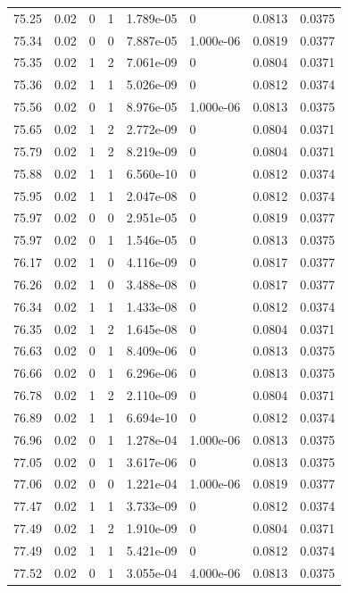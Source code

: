 \documentclass[preview]{standalone}
\begin{document}
{{{{{{{{{{{\begin{tabular}{L{1.2cm}C{1.2cm} C{0.3cm}C{0.5cm} C{1.4cm}C{1.4cm} C{1.4cm}C{1.4cm}}
  75.25  &  0.02  & 0     &  1 &  1.789e-05  & 0  & 0.0813 &  0.0375   \\ 
  75.34  &  0.02  & 0     &  0 &  7.887e-05  & 1.000e-06  & 0.0819 &  0.0377   \\ 
  75.35  &  0.02  & 1     &  2 &  7.061e-09  & 0  & 0.0804 &  0.0371   \\ 
  75.36  &  0.02  & 1     &  1 &  5.026e-09  & 0  & 0.0812 &  0.0374   \\ 
  75.56  &  0.02  & 0     &  1 &  8.976e-05  & 1.000e-06  & 0.0813 &  0.0375   \\ 
  75.65  &  0.02  & 1     &  2 &  2.772e-09  & 0  & 0.0804 &  0.0371   \\ 
  75.79  &  0.02  & 1     &  2 &  8.219e-09  & 0  & 0.0804 &  0.0371   \\ 
  75.88  &  0.02  & 1     &  1 &  6.560e-10  & 0  & 0.0812 &  0.0374   \\ 
  75.95  &  0.02  & 1     &  1 &  2.047e-08  & 0  & 0.0812 &  0.0374   \\ 
  75.97  &  0.02  & 0     &  0 &  2.951e-05  & 0  & 0.0819 &  0.0377   \\ 
  75.97  &  0.02  & 0     &  1 &  1.546e-05  & 0  & 0.0813 &  0.0375   \\ 
  76.17  &  0.02  & 1     &  0 &  4.116e-09  & 0  & 0.0817 &  0.0377   \\ 
  76.26  &  0.02  & 1     &  0 &  3.488e-08  & 0  & 0.0817 &  0.0377   \\ 
  76.34  &  0.02  & 1     &  1 &  1.433e-08  & 0  & 0.0812 &  0.0374   \\ 
  76.35  &  0.02  & 1     &  2 &  1.645e-08  & 0  & 0.0804 &  0.0371   \\ 
  76.63  &  0.02  & 0     &  1 &  8.409e-06  & 0  & 0.0813 &  0.0375   \\ 
  76.66  &  0.02  & 0     &  1 &  6.296e-06  & 0  & 0.0813 &  0.0375   \\ 
  76.78  &  0.02  & 1     &  2 &  2.110e-09  & 0  & 0.0804 &  0.0371   \\ 
  76.89  &  0.02  & 1     &  1 &  6.694e-10  & 0  & 0.0812 &  0.0374   \\ 
  76.96  &  0.02  & 0     &  1 &  1.278e-04  & 1.000e-06  & 0.0813 &  0.0375   \\ 
  77.05  &  0.02  & 0     &  1 &  3.617e-06  & 0  & 0.0813 &  0.0375   \\ 
  77.06  &  0.02  & 0     &  0 &  1.221e-04  & 1.000e-06  & 0.0819 &  0.0377   \\ 
  77.47  &  0.02  & 1     &  1 &  3.733e-09  & 0  & 0.0812 &  0.0374   \\ 
  77.49  &  0.02  & 1     &  2 &  1.910e-09  & 0  & 0.0804 &  0.0371   \\ 
  77.49  &  0.02  & 1     &  1 &  5.421e-09  & 0  & 0.0812 &  0.0374   \\ 
  77.52  &  0.02  & 0     &  1 &  3.055e-04  & 4.000e-06  & 0.0813 &  0.0375   \\ 
\hline 
\end{tabular} 

}}}}}}}}}}}
\end{document}
